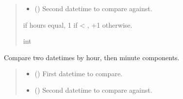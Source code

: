 \documentclass[letterpaper,10pt,english]{sphinxmanual}
\begin{document}
\begin{fulllineitems}
\begin{fulllineitems}
\begin{quote}
\begin{description}
\begin{itemize}
\item {} 
\sphinxAtStartPar
{} () \textendash{} Second datetime to compare against.

\end{itemize}

 if hours equal, \sphinxhyphen{}1 if  \textless{} , +1 otherwise.

\sphinxAtStartPar
int

\end{description}\end{quote}

\end{fulllineitems}


\begin{fulllineitems}
\label{\detokenize{apache_commons_validator_python.routines:apache_commons_validator_python.routines.time_validator.TimeValidator.compare_minutes}}
\pysigstartsignatures
{}
\pysigstopsignatures
\sphinxAtStartPar
Compare two datetimes by hour, then minute components.
\begin{quote}\begin{description}
\begin{itemize}
\item {} 
\sphinxAtStartPar
{} () \textendash{} First datetime to compare.

\item {} 
\sphinxAtStartPar
{} () \textendash{} Second datetime to compare against.

\end{itemize}


\end{description}
\end{quote}
\end{fulllineitems}
\end{fulllineitems}
\end{document}
